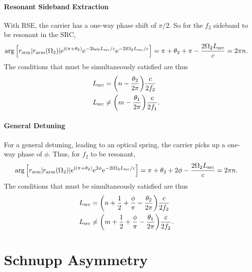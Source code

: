 \documentclass[12pt]{article}
\newcommand{\mr}[1]{\mathrm{#1}}
\newcommand{\e}{\mr{e}}
\renewcommand{\i}{\mr{i}}
\newcommand{\abs}[1]{\left|#1\right|}
\let\originalleft\left
\let\originalright\right
\renewcommand{\left}{\mathopen{}\mathclose\bgroup\originalleft}
\renewcommand{\right}{\aftergroup\egroup\originalright}
\begin{document}
\paragraph{Resonant Sideband Extraction} With RSE, the carrier has a one-way phase shift of $\pi/2$. So for the $f_2$ sideband to be resonant in the SRC,
\begin{equation}
\arg \Big[r_\mr{srm} \abs{r_\mr{arm}(\Omega_2)}\e^{\i(\pi + \theta_2)} \e^{-2\i\omega_0 L_\mr{src}/c}
\e^{-2\i\Omega_2 L_\mr{src}/c} \Big]
= \pi + \theta_2 + \pi - \frac{2\Omega_2 L_\mr{src}}{c}
= 2\pi n.
\end{equation}
The conditions that must be simultaneously satisfied are thus
\begin{subequations}
\begin{align}
L_\mr{src} &= \left( n - \frac{\theta_2}{2\pi}\right) \frac{c}{2f_2}\\
L_\mr{src} &\neq \left( m  - \frac{\theta_1}{2\pi}\right) \frac{c}{2f_1}.
\end{align}
\end{subequations}

\paragraph{General Detuning} For a general detuning, leading to an optical spring, the carrier picks up a one-way phase of $\phi$. Thus, for $f_2$ to be resonant,
\begin{equation}
\arg \Big[r_\mr{srm} \abs{r_\mr{arm}(\Omega_2)}\e^{\i(\pi + \theta_2)} \e^{2\phi}
\e^{-2\i\Omega_2 L_\mr{src}/c} \Big]
= \pi + \theta_2 + 2\phi - \frac{2\Omega_2 L_\mr{src}}{c}
= 2\pi n.
\end{equation}
The conditions that must be simultaneously satisfied are thus
\begin{subequations}
\begin{align}
L_\mr{src} &= \left( n + \frac{1}{2} + \frac{\phi}{\pi} - \frac{\theta_2}{2\pi}\right) \frac{c}{2f_2}\\
L_\mr{src} &\neq \left( m + \frac{1}{2} + \frac{\phi}{\pi} - \frac{\theta_1}{2\pi}\right) \frac{c}{2f_2}.
\end{align}
\end{subequations}

\section{Schnupp Asymmetry}
\end{document}
